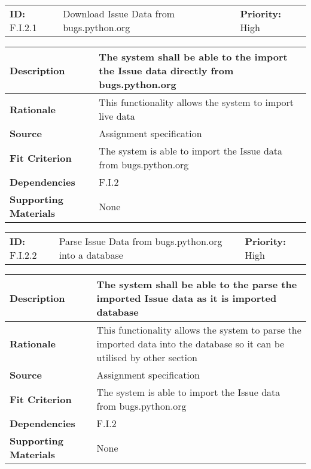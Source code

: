 \begin{table}[H]
    \begin{tabularx}{\textwidth}{| l | X | l |}
        \hline
        \textbf{ID:} F.I.2.1 & Download Issue Data from bugs.python.org & \textbf{Priority:} High \\
    \end{tabularx}
    \begin{tabularx}{\textwidth}{| l | X |}
        \hline
        \textbf{Description} & The system shall be able to the import the Issue data directly from bugs.python.org \\ \hline
        \textbf{Rationale} & This functionality allows the system to import live data\\ \hline
        \textbf{Source} & Assignment specification\\ \hline
        \textbf{Fit Criterion} & The system is able to import the Issue data from bugs.python.org\\ \hline
        \textbf{Dependencies} & F.I.2 \\ \hline
        \textbf{Supporting Materials} & None \\ \hline
    \end{tabularx}
\end{table}

\begin{table}[H]
    \begin{tabularx}{\textwidth}{| l | X | l |}
        \hline
        \textbf{ID:} F.I.2.2 & Parse Issue Data from bugs.python.org into a database & \textbf{Priority:} High \\
    \end{tabularx}
    \begin{tabularx}{\textwidth}{| l | X |}
        \hline
        \textbf{Description} & The system shall be able to the parse the imported Issue data as it is imported database\\ \hline
        \textbf{Rationale} & This functionality allows the system to parse the imported data into the database so it can be utilised by other section\\ \hline
        \textbf{Source} & Assignment specification\\ \hline
        \textbf{Fit Criterion} & The system is able to import the Issue data from bugs.python.org\\ \hline
        \textbf{Dependencies} & F.I.2 \\ \hline
        \textbf{Supporting Materials} & None \\ \hline
    \end{tabularx}
\end{table}

